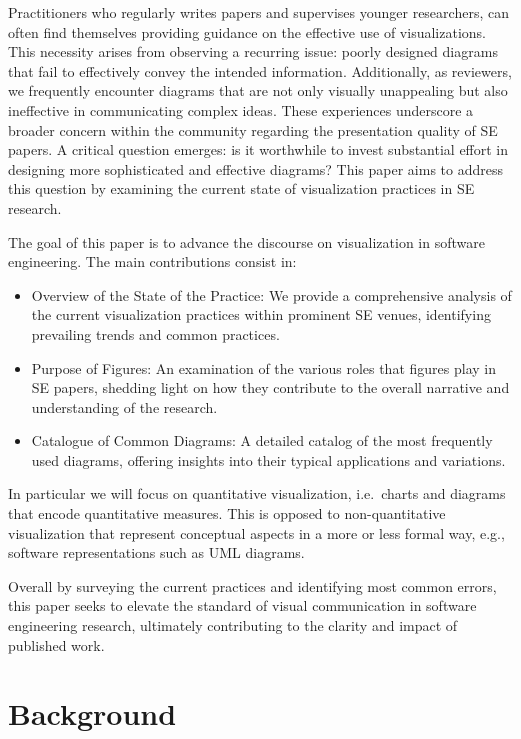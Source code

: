 \documentclass[
  10pt,
  conference,
]{IEEEtran}%
\providecommand{\tightlist}{%
  \setlength{\itemsep}{0pt}\setlength{\parskip}{0pt}}\usepackage{longtable,booktabs,array}
\begin{document}
Practitioners who regularly writes papers and supervises younger
researchers, can often find themselves providing guidance on the
effective use of visualizations. This necessity arises from observing a
recurring issue: poorly designed diagrams that fail to effectively
convey the intended information. Additionally, as reviewers, we
frequently encounter diagrams that are not only visually unappealing but
also ineffective in communicating complex ideas. These experiences
underscore a broader concern within the community regarding the
presentation quality of SE papers. A critical question emerges: is it
worthwhile to invest substantial effort in designing more sophisticated
and effective diagrams? This paper aims to address this question by
examining the current state of visualization practices in SE research.

The goal of this paper is to advance the discourse on visualization in
software engineering. The main contributions consist in:

\begin{itemize}
\tightlist
\item
  Overview of the State of the Practice: We provide a comprehensive
  analysis of the current visualization practices within prominent SE
  venues, identifying prevailing trends and common practices.
\item
  Purpose of Figures: An examination of the various roles that figures
  play in SE papers, shedding light on how they contribute to the
  overall narrative and understanding of the research.
\item
  Catalogue of Common Diagrams: A detailed catalog of the most
  frequently used diagrams, offering insights into their typical
  applications and variations.
\end{itemize}

In particular we will focus on quantitative visualization, i.e.~charts
and diagrams that encode quantitative measures. This is opposed to
non-quantitative visualization that represent conceptual aspects in a
more or less formal way, e.g., software representations such as UML
diagrams.

Overall by surveying the current practices and identifying most common
errors, this paper seeks to elevate the standard of visual communication
in software engineering research, ultimately contributing to the clarity
and impact of published work.

\section{Background}\label{background}
\end{document}
